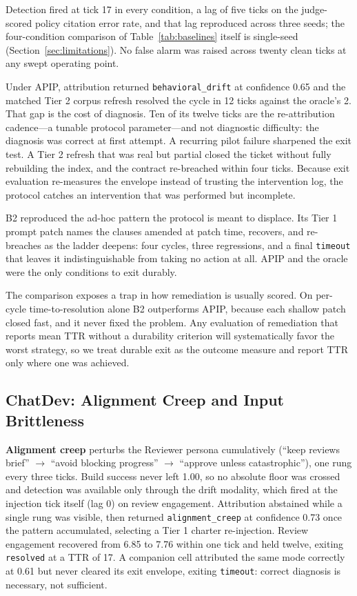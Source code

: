 \documentclass[conference]{IEEEtran}
\newcommand{\code}[1]{\texttt{\small #1}}
\begin{document}
Detection fired at tick 17 in every condition, a lag of five ticks on the
judge-scored policy citation error rate, and that lag reproduced across three
seeds; the four-condition comparison of Table~\ref{tab:baselines} itself is
single-seed (Section~\ref{sec:limitations}). No false alarm was raised across
twenty clean ticks at any swept operating point.

Under APIP, attribution returned \code{behavioral\_drift} at confidence 0.65
and the matched Tier 2 corpus refresh resolved the cycle in 12 ticks against
the oracle's 2. That gap is the cost of diagnosis. Ten of its twelve ticks are
the re-attribution cadence---a tunable protocol parameter---and not diagnostic
difficulty: the diagnosis was correct at first attempt. A recurring pilot
failure sharpened the exit test. A Tier 2 refresh that was real but partial
closed the ticket without fully rebuilding the index, and the contract
re-breached within four ticks. Because exit evaluation re-measures the envelope
instead of trusting the intervention log, the protocol catches an intervention
that was performed but incomplete.

B2 reproduced the ad-hoc pattern the protocol is meant to displace. Its Tier 1
prompt patch names the clauses amended at patch time, recovers, and re-breaches
as the ladder deepens: four cycles, three regressions, and a final
\code{timeout} that leaves it indistinguishable from taking no action at all.
APIP and the oracle were the only conditions to exit durably.

The comparison exposes a trap in how remediation is usually scored. On
per-cycle time-to-resolution alone B2 outperforms APIP, because each shallow
patch closed fast, and it never fixed the problem. Any evaluation of
remediation that reports mean TTR without a durability criterion will
systematically favor the worst strategy, so we treat durable exit as the
outcome measure and report TTR only where one was achieved.

\subsection{ChatDev: Alignment Creep and Input Brittleness}
\label{sec:chatdev}

\textbf{Alignment creep} perturbs the Reviewer persona cumulatively (``keep
reviews brief'' $\rightarrow$ ``avoid blocking progress'' $\rightarrow$
``approve unless catastrophic''), one rung every three ticks. Build success
never left 1.00, so no absolute floor was crossed and detection was available
only through the drift modality, which fired at the injection tick itself
(lag 0) on review engagement. Attribution abstained while a single rung was
visible, then returned \code{alignment\_creep} at confidence 0.73 once the
pattern accumulated, selecting a Tier 1 charter re-injection. Review engagement
recovered from 6.85 to 7.76 within one tick and held twelve, exiting
\code{resolved} at a TTR of 17. A companion cell attributed the same mode
correctly at 0.61 but never cleared its exit envelope, exiting \code{timeout}:
correct diagnosis is necessary, not sufficient.
\end{document}
